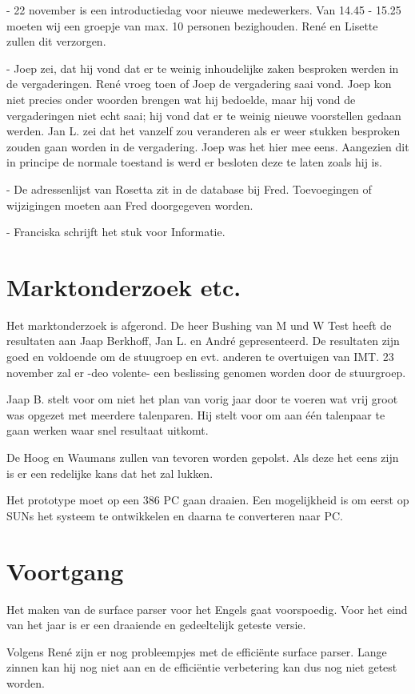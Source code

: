 - 22 november is een introductiedag voor nieuwe medewerkers. Van 14.45 - 15.25 
moeten wij een groepje van max. 10 personen bezighouden. Ren\'{e} en Lisette 
zullen dit verzorgen.

- Joep zei, dat hij vond dat er te weinig inhoudelijke zaken besproken 
werden in de vergaderingen. Ren\'{e} vroeg toen of Joep de vergadering saai 
vond. Joep kon niet precies onder woorden brengen wat hij bedoelde, maar hij 
vond de vergaderingen niet echt saai; hij vond dat er te weinig nieuwe 
voorstellen gedaan werden. Jan L. zei 
dat het vanzelf zou veranderen als er weer stukken besproken zouden gaan 
worden in de vergadering. Joep was het hier mee eens. Aangezien dit in principe
de normale
toestand is werd er besloten deze te laten zoals hij is. 

- De adressenlijst van Rosetta zit in de database bij Fred. Toevoegingen of 
wijzigingen moeten aan Fred doorgegeven worden.

- Franciska schrijft het stuk voor Informatie.
\section{Marktonderzoek etc.}

Het marktonderzoek is afgerond. De heer Bushing van M und W Test heeft
de resultaten aan Jaap Berkhoff, Jan L. en Andr\'{e} gepresenteerd. De 
resultaten zijn goed en voldoende om de stuugroep en evt. anderen te overtuigen 
van IMT. 23 november zal er -deo volente- een beslissing genomen worden door de 
stuurgroep.

Jaap B. stelt voor om niet het plan van vorig jaar door te voeren wat vrij 
groot was opgezet met meerdere talenparen. Hij stelt voor om aan \'{e}\'{e}n 
talenpaar te gaan werken waar snel resultaat uitkomt.

De Hoog en Waumans zullen van tevoren worden gepolst. Als deze het eens zijn is 
er een redelijke kans dat het zal lukken.

Het prototype moet op een 386 PC gaan draaien. Een mogelijkheid is om eerst op 
SUNs het systeem te ontwikkelen en daarna te converteren naar PC.


\section{Voortgang}
Het maken van de surface parser voor het Engels gaat voorspoedig. Voor het eind 
van het jaar is er een draaiende en gedeeltelijk geteste versie.

Volgens Ren\'{e} zijn er nog probleempjes met de effici\"{e}nte surface parser. 
Lange zinnen kan hij nog niet aan en de effici\"{e}ntie verbetering kan dus nog 
niet getest worden.

